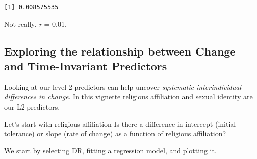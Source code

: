 \documentclass[
  11pt,
]{book}
\newenvironment{Shaded}{\begin{snugshade}}{\end{snugshade}}
\newcommand{\AttributeTok}[1]{\textcolor[rgb]{0.77,0.63,0.00}{#1}}
\newcommand{\CommentTok}[1]{\textcolor[rgb]{0.56,0.35,0.01}{\textit{#1}}}
\newcommand{\ConstantTok}[1]{\textcolor[rgb]{0.00,0.00,0.00}{#1}}
\newcommand{\ControlFlowTok}[1]{\textcolor[rgb]{0.13,0.29,0.53}{\textbf{#1}}}
\newcommand{\DecValTok}[1]{\textcolor[rgb]{0.00,0.00,0.81}{#1}}
\newcommand{\FunctionTok}[1]{\textcolor[rgb]{0.00,0.00,0.00}{#1}}
\newcommand{\NormalTok}[1]{#1}
\newcommand{\OtherTok}[1]{\textcolor[rgb]{0.56,0.35,0.01}{#1}}
\newcommand{\SpecialCharTok}[1]{\textcolor[rgb]{0.00,0.00,0.00}{#1}}
\newcommand{\StringTok}[1]{\textcolor[rgb]{0.31,0.60,0.02}{#1}}
\begin{document}
\begin{verbatim}
[1] 0.008575535
\end{verbatim}

Not really. \emph{r} = 0.01.

\hypertarget{exploring-the-relationship-between-change-and-time-invariant-predictors}{%
\subsection{Exploring the relationship between Change and Time-Invariant Predictors}\label{exploring-the-relationship-between-change-and-time-invariant-predictors}}

Looking at our level-2 predictors can help uncover \emph{systematic interindividual differences in change}. In this vignette religious affiliation and sexual identity are our L2 predictors.

Let's start with religious affiliation Is there a difference in intercept (initial tolerance) or slope (rate of change) as a function of religious affiliation?

We start by selecting DR, fitting a regression model, and plotting it.

\begin{Shaded}
\end{Shaded}

\begin{Shaded}
\end{Shaded}
\end{document}
